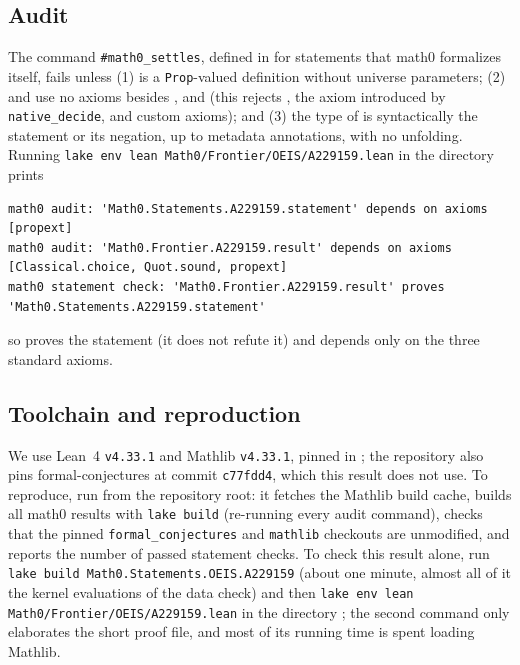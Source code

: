 \documentclass[11pt]{amsart}
\theoremstyle{plain}
\theoremstyle{definition}
\begin{document}
\subsection*{Audit}
The command \texttt{\#math0\_settles}, defined in  for statements that math0 formalizes itself, fails unless (1)  is a \texttt{Prop}-valued definition without universe parameters; (2)  and  use no axioms besides ,  and  (this rejects , the axiom  introduced by \texttt{native\_decide}, and custom axioms); and (3) the type of  is syntactically the statement or its negation, up to metadata annotations, with no unfolding.
Running \texttt{lake env lean Math0/Frontier/OEIS/A229159.lean} in the directory  prints
\begin{lstlisting}[basicstyle=\ttfamily\scriptsize]
math0 audit: 'Math0.Statements.A229159.statement' depends on axioms [propext]
math0 audit: 'Math0.Frontier.A229159.result' depends on axioms [Classical.choice, Quot.sound, propext]
math0 statement check: 'Math0.Frontier.A229159.result' proves 'Math0.Statements.A229159.statement'
\end{lstlisting}
so  proves the statement (it does not refute it) and depends only on the three standard axioms.

\subsection*{Toolchain and reproduction}
We use Lean~4 \cite{Lean4} \texttt{v4.33.1} and Mathlib \cite{Mathlib} \texttt{v4.33.1}, pinned in ; the repository also pins formal-conjectures \cite{FC} at commit \texttt{c77fdd4}, which this result does not use.
To reproduce, run  from the repository root: it fetches the Mathlib build cache, builds all math0 results with \texttt{lake build} (re-running every audit command), checks that the pinned \texttt{formal\_conjectures} and \texttt{mathlib} checkouts are unmodified, and reports the number of passed statement checks.
To check this result alone, run \texttt{lake build Math0.Statements.OEIS.A229159} (about one minute, almost all of it the kernel evaluations of the data check) and then \texttt{lake env lean Math0/Frontier/OEIS/A229159.lean} in the directory ; the second command only elaborates the short proof file, and most of its running time is spent loading Mathlib.
\end{document}
